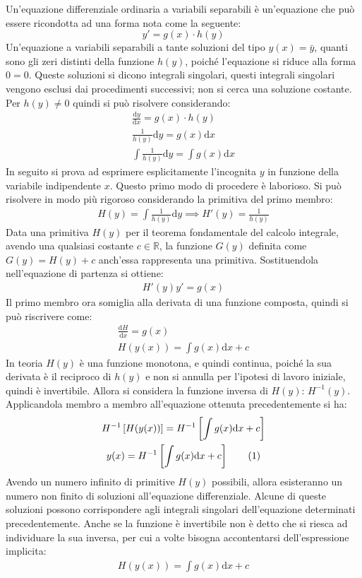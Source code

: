 \documentclass{article}
\newcommand{\df}{\mathrm{d}}
\numberwithin{equation}{subsection}
\newcommand{\tageq}{\tag{\stepcounter{equation}\theequation}}
\begin{document}
Un'equazione differenziale ordinaria a variabili separabili è un'equazione che può essere ricondotta ad una forma nota come la seguente:
\begin{equation}
    y'=g(x)\cdot h(y)
\end{equation}
Un'equazione a variabili separabili a tante soluzioni del tipo $y(x)=\bar{y}$, quanti sono gli zeri distinti della funzione $h(y)$, poiché l'equazione si riduce alla forma $0=0$. Queste soluzioni si dicono integrali singolari, questi integrali singolari vengono esclusi dai procedimenti successivi; non si cerca una soluzione costante. Per $h(y)\neq0$ quindi si può risolvere considerando:
\begin{gather*}
    \displaystyle\frac{\df y}{\df x}=g(x)\cdot h(y)\\
    \displaystyle\frac{1}{h(y)}\df y=g(x)\df x\\
    \displaystyle\int\frac{1}{h(y)}\df y=\int g(x)\df x
\end{gather*}
In seguito si prova ad esprimere esplicitamente l'incognita $y$ in funzione della variabile indipendente $x$. Questo primo modo di procedere è laborioso. 
Si può risolvere in modo più rigoroso considerando la primitiva del primo membro:
\begin{gather*}
    H(y)=\displaystyle\int\frac{1}{h(y)}\df y\implies H'(y)=\frac{1}{h(y)}
\end{gather*}
Data una primitiva $H(y)$ per il teorema fondamentale del calcolo integrale, avendo una qualsiasi costante $c\in\mathbb{R}$, la funzione $G(y)$ definita come $G(y)=H(y)+c$ anch'essa rappresenta una primitiva. 
Sostituendola nell'equazione di partenza si ottiene:
\begin{gather*}
    H'(y)y'=g(x)
\end{gather*}
Il primo membro ora somiglia alla derivata di una funzione composta, quindi si può riscrivere come:
\begin{gather*}
    \displaystyle\frac{ \df H}{\df x}=g(x)\\
    \displaystyle H(y(x))=\int g(x)\df x+c
\end{gather*}
In teoria $H(y)$ è una funzione monotona, e quindi continua, poiché la sua derivata è il reciproco di $h(y)$ e non si annulla per l'ipotesi di lavoro iniziale, quindi è invertibile. Allora si considera la funzione inversa di $H(y)$: $H^{-1}(y)$. Applicandola membro a membro all'equazione ottenuta precedentemente si ha:
\begin{gather*}
    H^{-1}\left[H(y(x))\right]=H^{-1}\left[\displaystyle\int g(x)\df x+c\right]\\
    y(x)=H^{-1}\left[\displaystyle\int g(x)\df x+c\right]\tageq
\end{gather*}
Avendo un numero infinito di primitive $H(y)$ possibili, allora esisteranno un numero non finito di soluzioni all'equazione differenziale. Alcune di queste soluzioni possono corrispondere agli integrali singolari dell'equazione determinati precedentemente. 
Anche se la funzione è invertibile non è detto che si riesca ad individuare la sua inversa, per cui a volte bisogna accontentarsi dell'espressione implicita: 
\begin{gather*}
    \displaystyle H(y(x))=\int g(x)\df x+c
\end{gather*}
\end{document}
